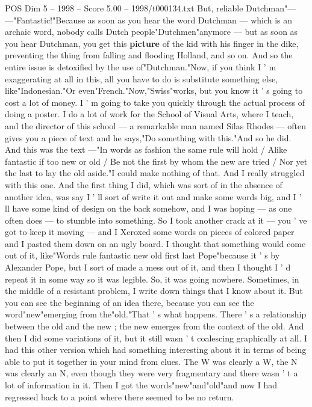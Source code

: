 \begin{textsample}{POS Dim 5 – 1998 – Score 5.00 – 1998/t000134.txt}
But, reliable Dutchman"— —"Fantastic!"Because as soon as you hear the word Dutchman — which is an archaic word, nobody calls Dutch people"Dutchmen"anymore — but as soon as you hear Dutchman, you get this \textbf{picture} of the kid with his finger in the dike, preventing the thing from falling and flooding Holland, and so on.
And so the entire issue is detoxified by the use of"Dutchman."Now, if you think I ' m exaggerating at all in this, all you have to do is substitute something else, like"Indonesian."Or even"French."Now,"Swiss"works, but you know it ' s going to cost a lot of money.
I ' m going to take you quickly through the actual process of doing a poster.
I do a lot of work for the School of Visual Arts, where I teach, and the director of this school — a remarkable man named Silas Rhodes — often gives you a piece of text and he says,"Do something with this."And so he did.
And this was the text —"In words as fashion the same rule will hold / Alike fantastic if too new or old / Be not the first by whom the new are tried / Nor yet the last to lay the old aside."I could make nothing of that.
And I really struggled with this one.
And the first thing I did, which was sort of in the absence of another idea, was say I ' ll sort of write it out and make some words big, and I ' ll have some kind of design on the back somehow, and I was hoping — as one often does — to stumble into something.
So I took another crack at it — you ' ve got to keep it moving — and I Xeroxed some words on pieces of colored paper and I pasted them down on an ugly board.
I thought that something would come out of it, like"Words rule fantastic new old first last Pope"because it ' s by Alexander Pope, but I sort of made a mess out of it, and then I thought I ' d repeat it in some way so it was legible.
So, it was going nowhere.
Sometimes, in the middle of a resistant problem, I write down things that I know about it.
But you can see the beginning of an idea there, because you can see the word"new"emerging from the"old."That ' s what happens.
There ' s a relationship between the old and the new ; the new emerges from the context of the old.
And then I did some variations of it, but it still wasn ' t coalescing graphically at all.
I had this other version which had something interesting about it in terms of being able to put it together in your mind from clues.
The W was clearly a W, the N was clearly an N, even though they were very fragmentary and there wasn ' t a lot of information in it.
Then I got the words"new"and"old"and now I had regressed back to a point where there seemed to be no return.

\end{textsample}
